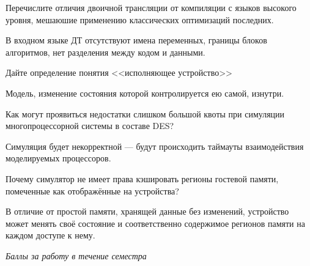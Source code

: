 \documentclass[a4paper, addpoints, answers]{exam}
\begin{document}
\begin{questions}
\question[3] Перечислите отличия двоичной трансляции от компиляции с языков высокого уровня, мешаюшие применению классических оптимизаций последних.
\begin{solution}[3cm]
В входном языке ДТ отсутствуют имена переменных, границы блоков алгоритмов, нет разделения между кодом и данными.
\end{solution}


\question[3] Дайте определение понятия <<исполняющее устройство>>
\begin{solution}[1cm]
Модель, изменение состояния которой контролируется ею самой, изнутри.
\end{solution}

\question[3] Как могут проявиться недостатки слишком большой квоты при симуляции многопроцессорной системы в составе DES?
\begin{solution}[2cm]
    Симуляция будет некорректной --- будут происходить таймауты взаимодействия моделируемых процессоров.
\end{solution}

\question[1] Почему симулятор не имеет права кэшировать регионы гостевой памяти, помеченные как отображённые на устройства?
\begin{solution}[2cm]
В отличие от простой памяти, хранящей данные без изменений, устройство может менять своё состояние и соответственно содержимое регионов памяти на каждом доступе к нему.
\end{solution}





\bonusquestion \textit{Баллы за работу в течение семестра}

\newpage
\phantom{Blank page}



\end{questions}
\end{document}
